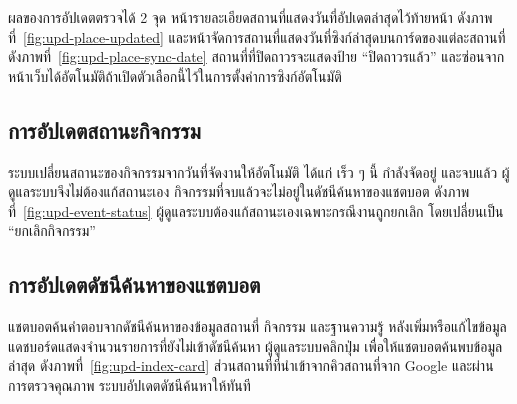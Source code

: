 ผลของการอัปเดตตรวจได้ 2 จุด หน้ารายละเอียดสถานที่แสดงวันที่อัปเดตล่าสุดไว้ท้ายหน้า ดังภาพที่~\ref{fig:upd-place-updated} และหน้าจัดการสถานที่แสดงวันที่ซิงก์ล่าสุดบนการ์ดของแต่ละสถานที่ ดังภาพที่~\ref{fig:upd-place-sync-date} สถานที่ที่ปิดถาวรจะแสดงป้าย ``ปิดถาวรแล้ว'' และซ่อนจากหน้าเว็บได้อัตโนมัติถ้าเปิดตัวเลือกนี้ไว้ในการตั้งค่าการซิงก์อัตโนมัติ



\subsection{การอัปเดตสถานะกิจกรรม}

ระบบเปลี่ยนสถานะของกิจกรรมจากวันที่จัดงานให้อัตโนมัติ ได้แก่ เร็ว ๆ นี้ กำลังจัดอยู่ และจบแล้ว ผู้ดูแลระบบจึงไม่ต้องแก้สถานะเอง กิจกรรมที่จบแล้วจะไม่อยู่ในดัชนีค้นหาของแชตบอต ดังภาพที่~\ref{fig:upd-event-status} ผู้ดูแลระบบต้องแก้สถานะเองเฉพาะกรณีงานถูกยกเลิก โดยเปลี่ยนเป็น ``ยกเลิกกิจกรรม''


\subsection{การอัปเดตดัชนีค้นหาของแชตบอต}

แชตบอตค้นคำตอบจากดัชนีค้นหาของข้อมูลสถานที่ กิจกรรม และฐานความรู้ หลังเพิ่มหรือแก้ไขข้อมูล แดชบอร์ดแสดงจำนวนรายการที่ยังไม่เข้าดัชนีค้นหา ผู้ดูแลระบบคลิกปุ่ม  เพื่อให้แชตบอตค้นพบข้อมูลล่าสุด ดังภาพที่~\ref{fig:upd-index-card} ส่วนสถานที่ที่นำเข้าจากคิวสถานที่จาก Google และผ่านการตรวจคุณภาพ ระบบอัปเดตดัชนีค้นหาให้ทันที


